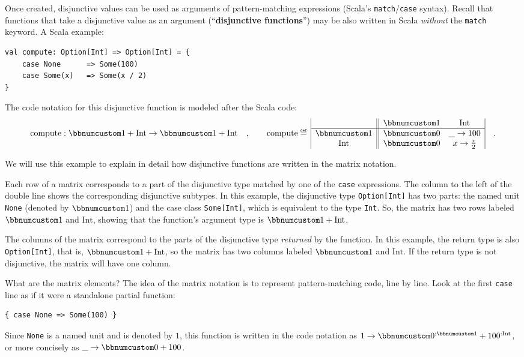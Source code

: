 Once created, disjunctive values can be used as arguments of pattern-matching
expressions (Scala\textsf{'}s \lstinline!match!/\lstinline!case! syntax).
Recall that functions that take a disjunctive value as an argument
(\textsf{``}\textbf{disjunctive functions}\textsf{''})
may be also written in Scala \emph{without} the \lstinline!match!
keyword. A Scala example:
\begin{lstlisting}
val compute: Option[Int] => Option[Int] = {
    case None      => Some(100)
    case Some(x)   => Some(x / 2)
}
\end{lstlisting}
The code notation for this disjunctive function is modeled after the
Scala code:
\[
\text{compute}:\bbnum 1+\text{Int}\rightarrow\bbnum 1+\text{Int}\quad,\quad\quad\text{compute}\triangleq\,\begin{array}{|c||cc|}
 & \bbnum 1 & \text{Int}\\
\hline \bbnum 1 & \bbnum 0 & \_\rightarrow100\\
\text{Int} & \bbnum 0 & x\rightarrow\frac{x}{2}
\end{array}\quad.
\]

We will use this example to explain in detail how disjunctive functions
are written in the matrix notation.

Each row of a matrix corresponds to a part of the disjunctive type
matched by one of the \lstinline!case! expressions. The column to
the left of the double line shows the corresponding disjunctive subtypes.
In this example, the disjunctive type \lstinline!Option[Int]! has
two parts: the named unit \lstinline!None! (denoted by $\bbnum 1$)
and the case class \lstinline!Some[Int]!, which is equivalent to
the type \lstinline!Int!. So, the matrix has two rows labeled $\bbnum 1$
and $\text{Int}$, showing that the function\textsf{'}s argument type is $\bbnum 1+\text{Int}$.

The columns of the matrix correspond to the parts of the disjunctive
type \emph{returned} by the function. In this example, the return
type is also \lstinline!Option[Int]!, that is, $\bbnum 1+\text{Int}$,
so the matrix has two columns labeled $\bbnum 1$ and $\text{Int}$.
If the return type is not disjunctive, the matrix will have one column.

What are the matrix elements? The idea of the matrix notation is to
represent pattern-matching code, line by line. Look at the first \lstinline!case!
line as if it were a standalone partial function:
\begin{lstlisting}
{ case None => Some(100) }
\end{lstlisting}
Since \lstinline!None! is a named unit and is denoted by $1$, this
function is written in the code notation as $1\rightarrow\bbnum 0^{:\bbnum 1}+100^{:\text{Int}}$,
or more concisely as $\_\rightarrow\bbnum 0+100$. 

